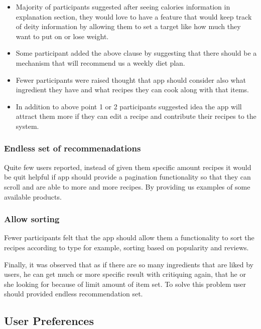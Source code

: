 	\begin{itemize}
		\item Majority of participants suggested after seeing calories information in explanation section, they would love to have a feature that would keep track of deity information by allowing them to set a target like how much they want to put on or lose weight.
		 
		 \item Some participant added the above clause by suggesting that there should be a mechanism that will recommend us a weekly diet plan.
		 
		 \item Fewer participants were raised thought that app should consider also what ingredient they have and what recipes they can cook along with that items. 

		\item In addition to above point 1 or 2 participants suggested idea the app will attract them more if they can edit a recipe and contribute their recipes to the system. 

	\end{itemize}

\subsubsection{Endless set of recommenadations}

Quite few users reported, instead of given them specific amount recipes it would be quit helpful if app should provide a pagination functionality so that they can scroll and are able to more and more recipes. By providing us examples of some available products.
	
\subsubsection{Allow sorting}
Fewer participants felt that the app should allow them a functionality to sort the recipes according to type for example, sorting based on popularity and reviews.\newline

Finally, it was observed that as if there are so many ingredients that are liked by users, he can get much or more specific result with critiquing again, that he or she looking for because of limit amount of item set. To solve this problem user should provided endless recommendation set.

\subsection{User Preferences}

